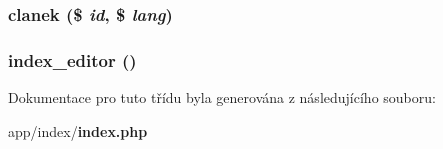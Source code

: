 \subsubsection[{clanek}]{\setlength{\rightskip}{0pt plus 5cm}clanek (\$ {\em id}, \/  \$ {\em lang})}\label{d0/d3a/classindex_a4412029624092e3e41c73fdde3fbfac9}
\subsubsection[{index\_\-editor}]{\setlength{\rightskip}{0pt plus 5cm}index\_\-editor ()}\label{d0/d3a/classindex_a6324732f87a1cdb27339e8e01243e5aa}


Dokumentace pro tuto třídu byla generována z následujícího souboru:\begin{DoxyCompactItemize}
\item 
app/index/{\bf index.php}\end{DoxyCompactItemize}
